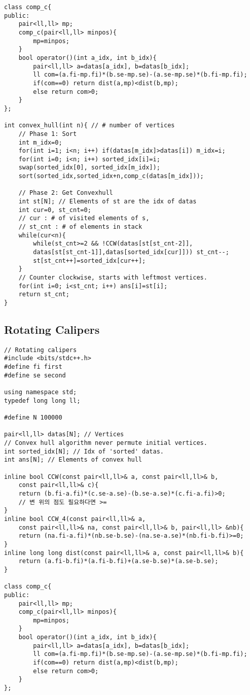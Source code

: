 \documentclass[10pt, landscape]{article}
\begin{document}
\begin{multicols}{2}
\begin{verbatim}
class comp_c{
public:
    pair<ll,ll> mp;
    comp_c(pair<ll,ll> minpos){
        mp=minpos;
    }
    bool operator()(int a_idx, int b_idx){
        pair<ll,ll> a=datas[a_idx], b=datas[b_idx];
        ll com=(a.fi-mp.fi)*(b.se-mp.se)-(a.se-mp.se)*(b.fi-mp.fi);
        if(com==0) return dist(a,mp)<dist(b,mp);
        else return com>0;
    }
};

int convex_hull(int n){ // # number of vertices
    // Phase 1: Sort
    int m_idx=0;
    for(int i=1; i<n; i++) if(datas[m_idx]>datas[i]) m_idx=i;
    for(int i=0; i<n; i++) sorted_idx[i]=i;
    swap(sorted_idx[0], sorted_idx[m_idx]);
    sort(sorted_idx,sorted_idx+n,comp_c(datas[m_idx]));
    
    // Phase 2: Get Convexhull
    int st[N]; // Elements of st are the idx of datas 
    int cur=0, st_cnt=0;
    // cur : # of visited elements of s,
    // st_cnt : # of elements in stack
    while(cur<n){
        while(st_cnt>=2 && !CCW(datas[st[st_cnt-2]],
        datas[st[st_cnt-1]],datas[sorted_idx[cur]])) st_cnt--;
        st[st_cnt++]=sorted_idx[cur++];
    }
    // Counter clockwise, starts with leftmost vertices.
    for(int i=0; i<st_cnt; i++) ans[i]=st[i]; 
    return st_cnt;
}
\end{verbatim}

\subsection{Rotating Calipers}
\begin{verbatim}
// Rotating calipers
#include <bits/stdc++.h>
#define fi first
#define se second

using namespace std;
typedef long long ll;

#define N 100000

pair<ll,ll> datas[N]; // Vertices 
// Convex hull algorithm never permute initial vertices.
int sorted_idx[N]; // Idx of 'sorted' datas.
int ans[N]; // Elements of convex hull

inline bool CCW(const pair<ll,ll>& a, const pair<ll,ll>& b, 
    const pair<ll,ll>& c){
    return (b.fi-a.fi)*(c.se-a.se)-(b.se-a.se)*(c.fi-a.fi)>0; 
    // 변 위의 점도 필요하다면 >=
}
inline bool CCW_4(const pair<ll,ll>& a, 
    const pair<ll,ll>& na, const pair<ll,ll>& b, pair<ll,ll> &nb){
    return (na.fi-a.fi)*(nb.se-b.se)-(na.se-a.se)*(nb.fi-b.fi)>=0;
}
inline long long dist(const pair<ll,ll>& a, const pair<ll,ll>& b){
    return (a.fi-b.fi)*(a.fi-b.fi)+(a.se-b.se)*(a.se-b.se);
}

class comp_c{
public:
    pair<ll,ll> mp;
    comp_c(pair<ll,ll> minpos){
        mp=minpos;
    }
    bool operator()(int a_idx, int b_idx){
        pair<ll,ll> a=datas[a_idx], b=datas[b_idx];
        ll com=(a.fi-mp.fi)*(b.se-mp.se)-(a.se-mp.se)*(b.fi-mp.fi);
        if(com==0) return dist(a,mp)<dist(b,mp);
        else return com>0;
    }
};


\end{verbatim}
\end{multicols}
\end{document}
